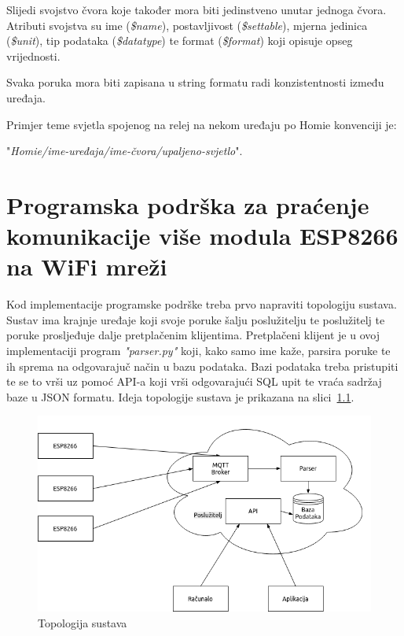 \documentclass[times, utf8, zavrsni]{fer}
\begin{document}
Slijedi svojstvo čvora koje također mora biti jedinstveno unutar jednoga čvora.
Atributi svojstva su ime (\textit{\$name}), postavljivost (\textit{\$settable}), mjerna jedinica (\textit{\$unit}), tip podataka (\textit{\$datatype}) te format (\textit{\$format}) koji opisuje opseg vrijednosti.

Svaka poruka mora biti zapisana u string formatu radi konzistentnosti između uređaja.

Primjer teme svjetla spojenog na relej na nekom uređaju po Homie konvenciji je:

"\textit{Homie/ime-uređaja/ime-čvora/upaljeno-svjetlo}".

\chapter{Programska podrška za praćenje komunikacije više modula ESP8266 na WiFi mreži}
Kod implementacije programske podrške treba prvo napraviti topologiju sustava.
Sustav ima krajnje uređaje koji svoje poruke šalju poslužitelju te poslužitelj te poruke prosljeđuje dalje pretplačenim klijentima.
Pretplačeni klijent je u ovoj implementaciji program \textit{"parser.py"} koji, kako samo ime kaže, parsira poruke te ih sprema na odgovarajuč način u bazu podataka.
Bazi podataka treba pristupiti te se to vrši uz pomoć API-a koji vrši odgovarajući SQL upit te vraća sadržaj baze u JSON formatu.
Ideja topologije sustava je prikazana na slici~\ref{fig:mreza}.

\begin{figure}[h]
    \centering
    \includegraphics[scale=0.5]{mreza.png}
    \caption{Topologija sustava}\label{fig:mreza}
\end{figure}

\end{document}
